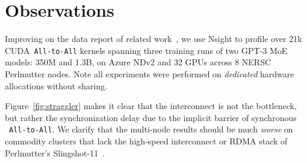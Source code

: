 
\section{Observations}\label{sec:observations}
Improving on the data report of related work~\cite{288705},
we use Nsight to profile over 21k CUDA~\verb|All-to-All| kernels spanning three training runs of two
GPT-3 MoE models: 350M and 1.3B, on Azure NDv2 and 32 GPUs across 8 NERSC Perlmutter nodes.
Note all experiments were performed on \emph{dedicated} hardware allocations without sharing.

Figure~\ref{fig:straggler} makes it clear that the interconnect is not the bottleneck,
but rather the synchronization delay due to the implicit barrier of synchronous ~\verb|All-to-All|.
We clarify that the multi-node results should be much \emph{worse} on commodity clusters that lack
the high-speed interconnect or RDMA stack of Perlmutter's Slingshot-11~\cite{Khorassani2023}.

